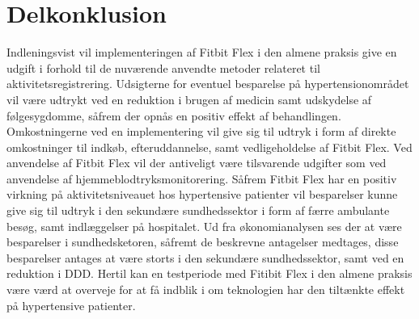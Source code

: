 \section{Delkonklusion}


Indleningsvist vil implementeringen af Fitbit Flex i den almene praksis give en udgift i forhold til de nuværende anvendte metoder relateret til aktivitetsregistrering. Udsigterne for eventuel besparelse på hypertensionområdet vil være udtrykt ved en reduktion i brugen af medicin samt udskydelse af følgesygdomme, såfrem der opnås en positiv effekt af behandlingen. Omkostningerne ved en implementering vil give sig til udtryk i form af direkte omkostninger til indkøb, efteruddannelse, samt vedligeholdelse af Fitbit Flex. Ved anvendelse af Fitbit Flex vil der antiveligt være tilsvarende udgifter som ved anvendelse af hjemmeblodtryksmonitorering. 
Såfrem Fitbit Flex har en positiv virkning på aktivitetsniveauet hos hypertensive patienter vil besparelser kunne give sig til udtryk i den sekundære sundhedssektor i form af færre ambulante besøg, samt indlæggelser på hospitalet.
Ud fra økonomianalysen ses der at være besparelser i sundhedsketoren, såfremt de beskrevne antagelser medtages, disse besparelser antages at være storts i den sekundære sundhedssektor, samt ved en reduktion i DDD. Hertil kan en testperiode med Fitibit Flex i den almene praksis være værd at overveje for at få indblik i om teknologien har den tiltænkte effekt på hypertensive patienter.  